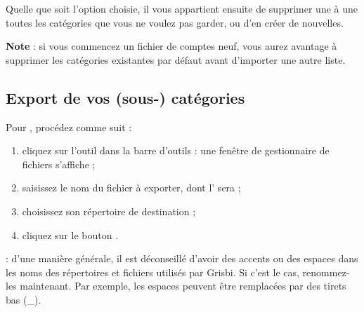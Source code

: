 Quelle que soit l'option choisie, il vous appartient ensuite de supprimer une à une toutes les catégories que vous ne voulez pas garder, ou d'en créer de nouvelles.

\textbf{Note} : si vous commencez un fichier de comptes neuf, vous aurez avantage à supprimer les catégories existantes par défaut avant d'importer une autre liste.


\subsection{Export de vos (sous-) catégories\label{categories-importexport-export} }

Pour , procédez comme suit :

\begin{enumerate}
	 \item cliquez sur l'outil  dans la barre d'outils : une fenêtre de gestionnaire de fichiers s'affiche ;
	 \item saisissez le nom du fichier à exporter, dont l' sera  ;
	 \item choisissez son répertoire de destination ;
	 \item cliquez sur le bouton .
\end{enumerate}

 : d'une manière générale, il est déconseillé d'avoir des accents ou des espaces dans les noms des répertoires et fichiers utilisés par Grisbi. Si c'est le cas, renommez-les maintenant. Par exemple, les espaces peuvent être remplacées par des tirets bas (\_).

%
%
